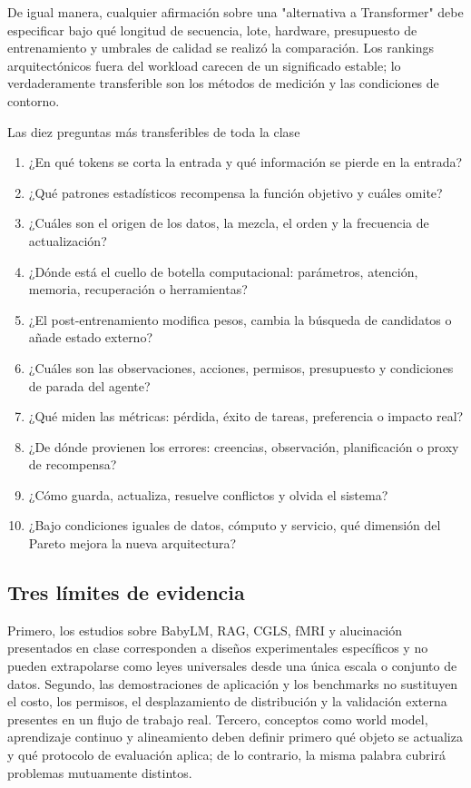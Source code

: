 De igual manera, cualquier afirmación sobre una "alternativa a Transformer" debe especificar bajo qué longitud de secuencia, lote, hardware, presupuesto de entrenamiento y umbrales de calidad se realizó la comparación. Los rankings arquitectónicos fuera del workload carecen de un significado estable; lo verdaderamente transferible son los métodos de medición y las condiciones de contorno.

\begin{importantbox}{Las diez preguntas más transferibles de toda la clase}
\begin{enumerate}
  \item ¿En qué tokens se corta la entrada y qué información se pierde en la entrada?
  \item ¿Qué patrones estadísticos recompensa la función objetivo y cuáles omite?
  \item ¿Cuáles son el origen de los datos, la mezcla, el orden y la frecuencia de actualización?
  \item ¿Dónde está el cuello de botella computacional: parámetros, atención, memoria, recuperación o herramientas?
  \item ¿El post-entrenamiento modifica pesos, cambia la búsqueda de candidatos o añade estado externo?
  \item ¿Cuáles son las observaciones, acciones, permisos, presupuesto y condiciones de parada del agente?
  \item ¿Qué miden las métricas: pérdida, éxito de tareas, preferencia o impacto real?
  \item ¿De dónde provienen los errores: creencias, observación, planificación o proxy de recompensa?
  \item ¿Cómo guarda, actualiza, resuelve conflictos y olvida el sistema?
  \item ¿Bajo condiciones iguales de datos, cómputo y servicio, qué dimensión del Pareto mejora la nueva arquitectura?
\end{enumerate}
\end{importantbox}

\subsection{Tres límites de evidencia}

Primero, los estudios sobre BabyLM, RAG, CGLS, fMRI y alucinación presentados en clase corresponden a diseños experimentales específicos y no pueden extrapolarse como leyes universales desde una única escala o conjunto de datos. Segundo, las demostraciones de aplicación y los benchmarks no sustituyen el costo, los permisos, el desplazamiento de distribución y la validación externa presentes en un flujo de trabajo real. Tercero, conceptos como world model, aprendizaje continuo y alineamiento deben definir primero qué objeto se actualiza y qué protocolo de evaluación aplica; de lo contrario, la misma palabra cubrirá problemas mutuamente distintos.

